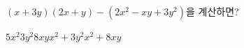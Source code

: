 $(x+3y)(2x+y)-(2x^2-xy+3y^2)$을 계산하면?
\begin{choices32}{$5x^2$}{$3y^2$}{$8xy$}{$x^2+3y^2$}{$x^2+8xy$}\end{choices32}

